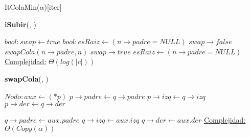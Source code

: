 \begin{Estructura}{ItColaMin($\alpha$)}[iter]
\begin{algorithm}[H]{\textbf{iSubir}(, )}
    	\begin{algorithmic}[1]
		\State $bool: swap \gets true$ 		
		\State $bool: esRaiz \gets (n \rightarrow padre = NULL)  $ 		
			\State $swap \rightarrow false$ 			
			 
				\State $swapCola(n \rightarrow padre, n) $ 
				\State $swap \rightarrow true$ 
			\EndIf			
			\State $esRaiz \gets (n \rightarrow padre = NULL)  $ 		
		\EndWhile
		\medskip
		\Statex \underline{Complejidad:} $\Theta(log(|c|))$
    	\end{algorithmic}
\end{algorithm}

\begin{algorithm}[H]{\textbf{swapCola}{(, })}
   	\begin{algorithmic}[1]
			\State $Nodo: aux \gets (*p) $ 
			\State $p \rightarrow padre \gets q \rightarrow padre $ 
			\State $p \rightarrow izq \gets q \rightarrow izq $ 
			\State $p \rightarrow der \gets q \rightarrow der $ 
			
			\State $q \rightarrow padre \gets aux.padre $ 
			\State $q \rightarrow izq \gets aux.izq $ 
			\State $q \rightarrow der \gets aux.der $ 
			\Statex \underline{Complejidad:} $\Theta(Copy(\alpha))$
   	\end{algorithmic}
\end{algorithm}    	
    	

\end{Estructura}
